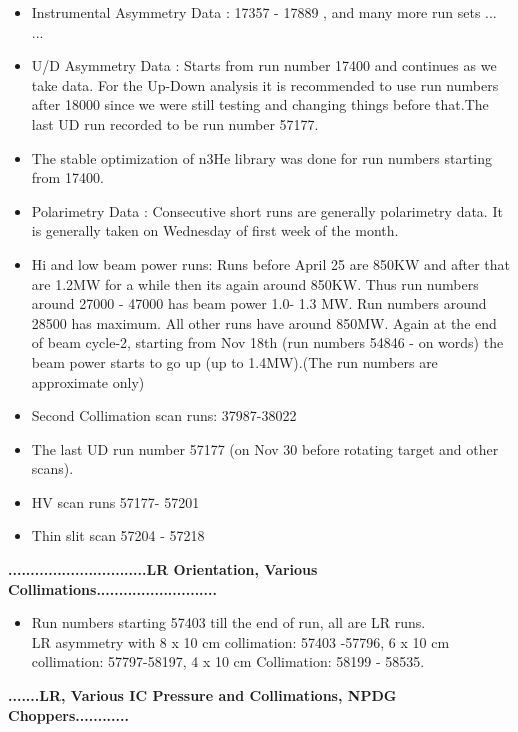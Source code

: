 \documentclass[12pt]{article}
\begin{document}
\begin{itemize}
\item Instrumental Asymmetry Data : 17357 - 17889 , and many more run sets ... ... 

\item U/D Asymmetry Data : Starts from run number 17400 and continues as we take data. For the Up-Down analysis it is recommended to use run numbers after 18000 since we were still testing and changing things before that.The last UD run recorded to be run number 57177. 

\item The stable optimization of n3He library was done for run numbers starting from 17400. 
  
\item Polarimetry Data : Consecutive short runs are generally polarimetry data. It is generally taken on Wednesday of first week of the month.

\item Hi and low beam power runs: Runs before April 25 are 850KW and after that are 1.2MW for a while then its again around 850KW. Thus run numbers around 27000 - 47000 has beam power 1.0- 1.3 MW. Run numbers around 28500 has maximum. All other runs have around 850MW. Again at the end of beam cycle-2, starting from Nov 18th (run numbers 54846 - on words) the beam power starts to go up (up to 1.4MW).(The run numbers are approximate only) 

\item Second Collimation scan runs: 37987-38022 
 
\item The last UD run number 57177 (on Nov 30 before rotating target and other scans).

\item HV scan runs 57177- 57201

\item Thin slit scan 57204 - 57218
\end{itemize}
\textbf{...............................LR Orientation, Various Collimations...........................}
\begin{itemize}
\item  Run numbers starting 57403 till the end of run, all are LR runs.\\
LR asymmetry with 8 x 10 cm collimation: 57403 -57796, 6 x 10 cm collimation: 57797-58197, 4 x 10 cm Collimation: 58199 - 58535. 
\end{itemize}
\textbf{.......LR, Various IC Pressure and Collimations, NPDG Choppers............}\\
\end{document}

